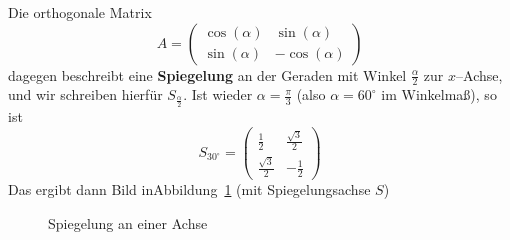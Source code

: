 \begin{beispiel}
 
Die orthogonale Matrix 
  	$$  A = \left( \begin{matrix} \cos(\alpha) & \sin(\alpha) \\ \sin(\alpha) & -\cos(\alpha) \end{matrix} \right) $$
dagegen beschreibt eine \textbf{Spiegelung} an der Geraden mit Winkel $\frac {\alpha}{2}$ 
zur $x$--Achse, und wir schreiben hierfür $S_{\frac {\alpha}{2}}$. Ist wieder 
$\alpha = \frac {\pi}{3}$ (also $\alpha = 60^{\circ}$ im Winkelmaß), so ist
  	$$ S_{30^{\circ}} =  \left( \begin{matrix} \frac {1}{2} & \frac {\sqrt{3}}{2} \\ 
	\frac {\sqrt{3}}{2} & -\frac {1}{2} \end{matrix} \right) $$
Das ergibt dann Bild inAbbildung~\ref{lin_05_det_3110} (mit Spiegelungsachse $S$)


\begin{figure}[h]
	\begin{center}
	\vspace{-0.5cm}
	\begin{scaletikzpicturetowidth}{\hsize}
     		 
	\end{scaletikzpicturetowidth}
	\vspace{-0.5cm}
	\caption{Spiegelung an einer Achse}\label{lin:05_det_3110}\label{lin_05_det_3110}
	\end{center}
	\vspace{-0.5cm}
\end{figure}

\end{beispiel}

